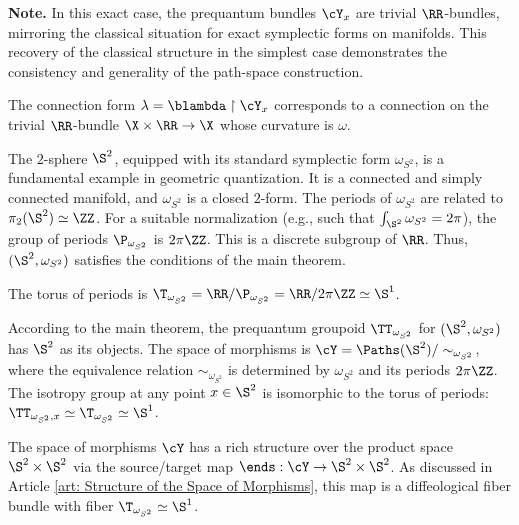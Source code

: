 \begin{article}
    \smallskip
    \textbf{Note.} In this exact case,
    the prequantum bundles $\cY_x$ are trivial $\RR$-bundles,
    mirroring the classical situation for exact symplectic forms on manifolds.
    This recovery of the classical structure in the simplest case demonstrates the consistency and generality of the path-space construction.
    
    The connection form $\lambda = \blambda \restriction \cY_x$ corresponds to a connection on the trivial $\RR$-bundle $\X \times \RR \to \X$ whose curvature is $\omega$.
  \end{article}
  
  
  \begin{article}
    \label{art: Example S2}
    
    The $2$-sphere $\S^2$,
    equipped with its standard symplectic form $\omega_{S^2}$,
    is a fundamental example in geometric quantization.
    It is a connected and simply connected manifold,
    and $\omega_{S^2}$ is a closed $2$-form.
    The periods of $\omega_{S^2}$ are related to $\pi_2(\S^2) \simeq \ZZ$.
    For a suitable normalization (e.g., such that $\int_{\S^2} \omega_{S^2} = 2\pi$),
    the group of periods $\P_{\omega_{S^2}}$ is $2\pi\ZZ$.
    This is a discrete subgroup of $\RR$.
    Thus, $(\S^2, \omega_{S^2})$ satisfies the conditions of the main theorem.
    
    The torus of periods is $\T_{\omega_{S^2}} = \RR/\P_{\omega_{S^2}} = \RR/2\pi\ZZ \simeq \S^1$.
    
    According to the main theorem,
    the prequantum groupoid $\TT_{\omega_{S^2}}$ for $(\S^2, \omega_{S^2})$ has $\S^2$ as its objects.
    The space of morphisms is $\cY = \Paths(\S^2) / \sim_{\omega_{S^2}}$,
    where the equivalence relation $\sim_{\omega_{S^2}}$ is determined by $\omega_{S^2}$ and its periods $2\pi\ZZ$.
    The isotropy group at any point $x \in \S^2$ is isomorphic to the torus of periods: $\TT_{\omega_{S^2}, x} \simeq \T_{\omega_{S^2}} \simeq \S^1$.
    
    The space of morphisms $\cY$ has a rich structure over the product space $\S^2 \times \S^2$ via the source/target map $\ends: \cY \to \S^2 \times \S^2$.
    As discussed in Article \ref{art: Structure of the Space of Morphisms},
    this map is a diffeological fiber bundle with fiber $\T_{\omega_{S^2}} \simeq \S^1$.
    

\end{article}
